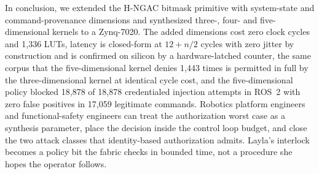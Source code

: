 \documentclass[conference]{IEEEtran}
\newcommand{\new}[1]{\textcolor{hkred}{#1}}
\begin{document}
In conclusion, we extended the H-NGAC bitmask primitive with system-state and command-provenance dimensions and synthesized \new{three-, }four- and five-dimensional kernels to a Zynq-7020. The added \new{dimensions} cost zero clock cycles and \new{1{,}336} LUTs, latency is closed-form at $12 + n/2$ cycles with zero jitter by construction \new{and is confirmed on silicon by a hardware-latched counter, the same corpus that the five-dimensional kernel denies 1{,}443 times is permitted in full by the three-dimensional kernel at identical cycle cost}, and the five-dimensional policy blocked 18{,}878 of 18{,}878 credentialed injection attempts in ROS~2 with zero false positives in 17{,}059 legitimate commands. Robotics platform engineers and functional-safety engineers can treat the authorization worst case as a synthesis parameter, place the decision inside the control loop budget, and close the two attack classes that identity-based authorization admits. Layla's interlock becomes a policy bit the fabric checks in bounded time, not a procedure she hopes the operator follows.



\end{document}
